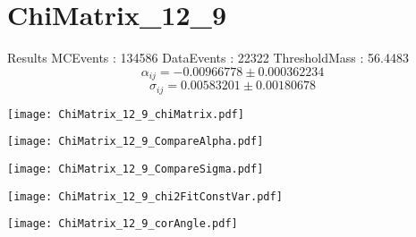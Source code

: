 \documentclass[a4paper,12pt]{article}
\begin{document}
\section{ChiMatrix\_12\_9}
\begin{minipage}{0.49\linewidth} Results \newline
MCEvents : 134586\newline
DataEvents : 22322 \newline
ThresholdMass : 56.4483\\
$$\alpha_{ij} = -0.00966778\pm 0.000362234$$
$$\sigma_{ij} = 0.00583201\pm 0.00180678$$
\end{minipage}\hfill
\begin{minipage}{0.49\linewidth} 
\texttt{[image: ChiMatrix\_12\_9\_chiMatrix.pdf]}\\
\end{minipage}
\hfill
\begin{minipage}{0.49\linewidth} 
\texttt{[image: ChiMatrix\_12\_9\_CompareAlpha.pdf]}\\
\end{minipage}
\hfill
\begin{minipage}{0.49\linewidth} 
\texttt{[image: ChiMatrix\_12\_9\_CompareSigma.pdf]}\\
\end{minipage}
\begin{minipage}{0.49\linewidth} 
\texttt{[image: ChiMatrix\_12\_9\_chi2FitConstVar.pdf]}\\
\end{minipage}
\hfill
\begin{minipage}{0.49\linewidth} 
\texttt{[image: ChiMatrix\_12\_9\_corAngle.pdf]}\\
\end{minipage}
\end{document}
